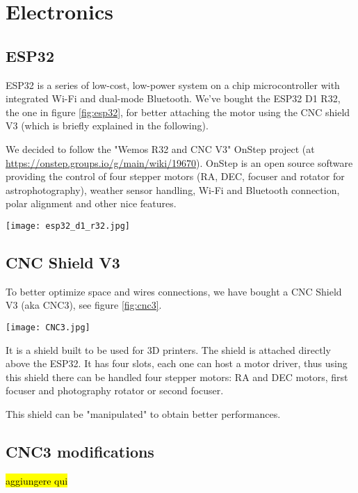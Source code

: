 \section{Electronics}
\label{sec:electronics}

\subsection{ESP32}
ESP32 is a series of low-cost, low-power system on a chip microcontroller with integrated Wi-Fi and dual-mode Bluetooth.
We've bought the ESP32 D1 R32, the one in figure \ref{fig:esp32}, for better attaching the motor using the CNC shield V3 (which is briefly explained in the following).

We decided to follow the "Wemos R32 and CNC V3" OnStep project (at \url{https://onstep.groups.io/g/main/wiki/19670}).
OnStep is an open source software providing the control of four stepper motors (RA, DEC, focuser and rotator for astrophotography), weather sensor handling, Wi-Fi and Bluetooth connection, polar alignment and other nice features.

\begin{minipage}
    {.4\textwidth}
    \centering
    \texttt{[image: esp32\_d1\_r32.jpg]}
    \label{fig:esp32}
\end{minipage}

\subsection{CNC Shield V3}
To better optimize space and wires connections, we have bought a CNC Shield V3 (aka CNC3), see figure \ref{fig:cnc3}.
\begin{minipage}
    {0.5\textwidth}
    \centering
    \texttt{[image: CNC3.jpg]}
    \label{fig:cnc3}
\end{minipage}
It is a shield built to be used for 3D printers.
The shield is attached directly above the ESP32.
It has four slots, each one can host a motor driver, thus using this shield there can be handled four stepper motors: RA and DEC motors, first focuser and photography rotator or second focuser.

This shield can be "manipulated" to obtain better performances.

\subsection{CNC3 modifications}
\hl{aggiungere qui}
